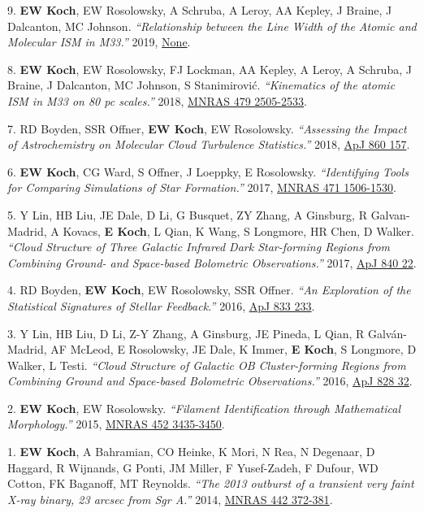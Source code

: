 \documentclass[letterpaper,11pt]{article}
\newenvironment{publist}{
  \begingroup
  \raggedright
  \begin{description}[leftmargin=4ex,style=sameline]
}{
  \end{description}
  \endgroup
}
\begin{document}
\begin{publist}
\item[9.] \textbf{EW Koch}, EW Rosolowsky, A Schruba, A Leroy, AA Kepley, J Braine, J Dalcanton, MC Johnson. \textit{``Relationship between the Line Width of the Atomic and Molecular ISM in M33.''} 2019, \href{http://adsabs.harvard.edu/abs/None}{None}.
\item[8.] \textbf{EW Koch}, EW Rosolowsky, FJ Lockman, AA Kepley, A Leroy, A Schruba, J Braine, J Dalcanton, MC Johnson, S Stanimirovi\'{c}. \textit{``Kinematics of the atomic ISM in M33 on 80 pc scales.''} 2018, \href{http://adsabs.harvard.edu/abs/2018MNRAS.479.2505K}{MNRAS 479 2505-2533}.
\item[7.] RD Boyden, SSR Offner, \textbf{EW Koch}, EW Rosolowsky. \textit{``Assessing the Impact of Astrochemistry on Molecular Cloud Turbulence Statistics.''} 2018, \href{http://adsabs.harvard.edu/abs/2018ApJ...860..157B}{ApJ 860 157}.
\item[6.] \textbf{EW Koch}, CG Ward, S Offner, J Loeppky, E Rosolowsky. \textit{``Identifying Tools for Comparing Simulations of Star Formation.''} 2017, \href{http://adsabs.harvard.edu/abs/2017MNRAS.471.1506K}{MNRAS 471 1506-1530}.
\item[5.] Y Lin, HB Liu, JE Dale, D Li, G Busquet, ZY Zhang, A Ginsburg, R Galvan-Madrid, A Kovacs, \textbf{E Koch}, L Qian, K Wang, S Longmore, HR Chen, D Walker. \textit{``Cloud Structure of Three Galactic Infrared Dark Star-forming Regions from Combining Ground- and Space-based Bolometric Observations.''} 2017, \href{http://adsabs.harvard.edu/abs/2017ApJ...840...22L}{ApJ 840 22}.
\item[4.] RD Boyden, \textbf{EW Koch}, EW Rosolowsky, SSR Offner. \textit{``An Exploration of the Statistical Signatures of Stellar Feedback.''} 2016, \href{http://adsabs.harvard.edu/abs/2016ApJ...833..233B}{ApJ 833 233}.
\item[3.] Y Lin, HB Liu, D Li, Z-Y Zhang, A Ginsburg, JE Pineda, L Qian, R Galv\'{a}n-Madrid, AF McLeod, E Rosolowsky, JE Dale, K Immer, \textbf{E Koch}, S Longmore, D Walker, L Testi. \textit{``Cloud Structure of Galactic OB Cluster-forming Regions from Combining Ground and Space-based Bolometric Observations.''} 2016, \href{http://adsabs.harvard.edu/abs/2016ApJ...828...32L}{ApJ 828 32}.
\item[2.] \textbf{EW Koch}, EW Rosolowsky. \textit{``Filament Identification through Mathematical Morphology.''} 2015, \href{http://adsabs.harvard.edu/abs/2015MNRAS.452.3435K}{MNRAS 452 3435-3450}.
\item[1.] \textbf{EW Koch}, A Bahramian, CO Heinke, K Mori, N Rea, N Degenaar, D Haggard, R Wijnands, G Ponti, JM Miller, F Yusef-Zadeh, F Dufour, WD Cotton, FK Baganoff, MT Reynolds. \textit{``The 2013 outburst of a transient very faint X-ray binary, 23 arcsec from Sgr A\textasteriskcentered.''} 2014, \href{http://adsabs.harvard.edu/abs/2014MNRAS.442..372K}{MNRAS 442 372-381}.
\end{publist}
\end{document}
